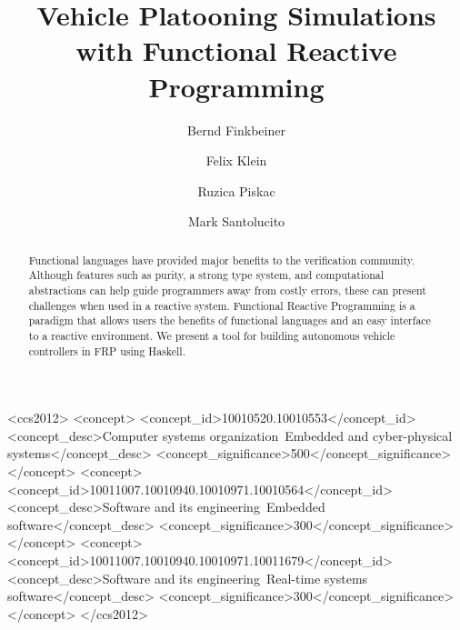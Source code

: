 \documentclass[sigconf]{acmart}
\begin{document}
\title{Vehicle Platooning Simulations with Functional Reactive Programming}

\author{Bernd Finkbeiner}

\author{Felix Klein}

\author{Ruzica Piskac}

\author{Mark Santolucito}

\begin{abstract}
Functional languages have provided major benefits to the verification community.
Although features such as purity, a strong type system, and computational abstractions can help guide programmers away from costly errors, these can present challenges when used in a reactive system.
Functional Reactive Programming is a paradigm that allows users the benefits of functional languages and an easy interface to a reactive environment.
We present a tool for building autonomous vehicle controllers in FRP using Haskell.
\end{abstract}

%
%
\begin{CCSXML}
<ccs2012>
<concept>
<concept_id>10010520.10010553</concept_id>
<concept_desc>Computer systems organization~Embedded and cyber-physical systems</concept_desc>
<concept_significance>500</concept_significance>
</concept>
<concept>
<concept_id>10011007.10010940.10010971.10010564</concept_id>
<concept_desc>Software and its engineering~Embedded software</concept_desc>
<concept_significance>300</concept_significance>
</concept>
<concept>
<concept_id>10011007.10010940.10010971.10011679</concept_id>
<concept_desc>Software and its engineering~Real-time systems software</concept_desc>
<concept_significance>300</concept_significance>
</concept>
</ccs2012>
\end{CCSXML}

\end{document}

